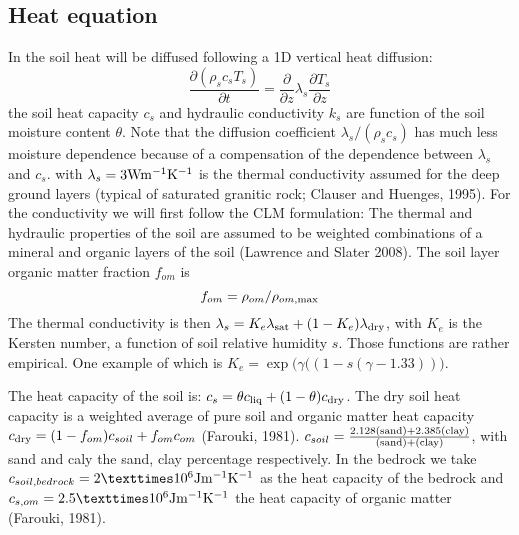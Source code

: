 \documentclass{article}
\begin{document}
\subsection{Heat equation}
In the soil heat will be diffused following a 1D vertical heat diffusion:
\begin{equation}
     \frac{\partial (\rho_s c_s T_s) }{\partial t} = \frac{\partial }{\partial z}\lambda_s \frac{\partial T_s }{\partial z}
\end{equation}
the soil heat capacity $c_s$ and hydraulic conductivity $k_s$ are function of the soil moisture content $\theta$. Note that the diffusion coefficient $\lambda_s/(\rho_s c_s)$ has much less moisture dependence because of a compensation of the dependence between $\lambda_s$ and $c_s$. with 
$\lambda_s =  3 \rm W  m^{-1}  K^{-1}$ is  the  thermal  conductivity  assumed  for  the  deep  ground  layers  (typical  of  saturated  granitic  rock;  Clauser  and  Huenges,  1995).
For the conductivity we will first follow the CLM formulation:
The thermal and hydraulic properties of the soil are assumed to be weighted combinations of a mineral and organic layers of the soil (Lawrence and Slater 2008). The soil layer organic matter fraction $f_{om}$ is 
\begin{equation}
    f_{om} = \rho_{om}/\rho_{om,{\rm max}}
\end{equation}
The thermal conductivity is then $\lambda_s = K_e \lambda_{\rm sat} + (1-K_e) \lambda_{\rm dry}$, with $K_e$ is the Kersten number, a function of soil relative humidity $s$. Those functions are rather empirical. One example of which is $K_e = \exp \big( \gamma((1-s(\gamma-1.33))\big)$.

The heat capacity of the soil is:
$c_s=\theta c_{\rm liq} + (1-\theta) c_{\rm dry}$.
The dry soil heat capacity is a weighted average of pure soil and organic matter heat capacity $c_{\rm dry} = (1-f_{om})c_{soil} + f_{om}c_{om}$ (Farouki, 1981).
$c_{soil} = {\rm \frac{2.128 (sand)+ 2.385 (clay)}{(sand) + (clay)}}$, with sand and caly the sand, clay  percentage respectively.
In the bedrock we take $c_{soil,bedrock} = 2 ×10^6 {\rm J m^{-1} K^{-1}}$ as the heat capacity of the bedrock and $c_{s,om} = 2.5 ×10^6 {\rm J m^{-1} K^{-1}}$ the heat capacity of organic matter (Farouki, 1981).
\end{document}
